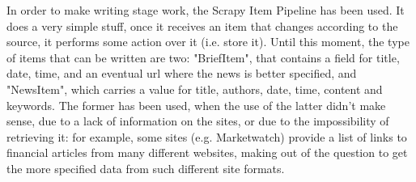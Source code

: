 In order to make writing stage work, the Scrapy Item Pipeline \cite{scrapypipeline} has been used. It does a very simple stuff, once it receives an item that changes according to the source, it performs some action over it (i.e. store it). Until this moment, the type of items that can be written are two: "BriefItem", that contains a field for title, date, time, and an eventual url where the news is better specified, and "NewsItem", which carries a value for title, authors, date, time, content and keywords. The former has been used, when the use of the latter didn't make sense, due to a lack of information on the sites, or due to the impossibility of retrieving it: for example, some sites (e.g. Marketwatch) provide a list of links to financial articles from many different websites, making out of the question to get the more specified data from such different site formats.
